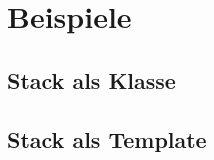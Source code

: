 \section{Beispiele}
	\subsection{Stack als Klasse}
		
	
\newpage	
	\subsection{Stack als Template}
		